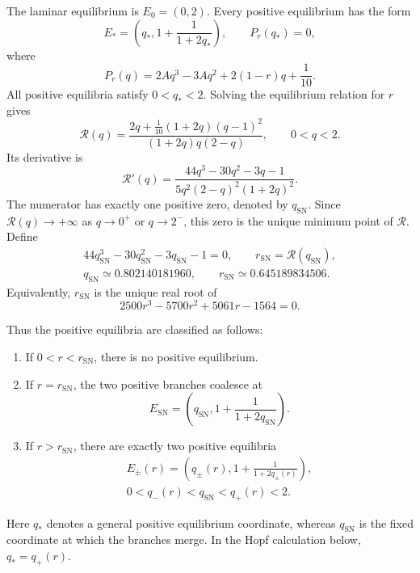 \documentclass[11pt,reqno]{amsart}
\theoremstyle{plain}
\theoremstyle{definition}
\theoremstyle{remark}
\begin{document}
The laminar equilibrium is $E_0=(0,2)$. Every positive equilibrium
has the form
\begin{equation}
E_*
=
\left(
q_*,
1+\frac{1}{1+2q_*}
\right),
\qquad
P_r(q_*)=0,
\label{eq:bl-positive-equilibrium}
\end{equation}
where
\begin{equation}
P_r(q)
=
2Aq^3-3Aq^2+2(1-r)q+\frac{1}{10}.
\label{eq:bl-equilibrium-polynomial}
\end{equation}
All positive equilibria satisfy $0<q_*<2$. Solving the equilibrium
relation for $r$ gives
\begin{equation}
\mathcal R(q)
=
\frac{
2q+\frac{1}{10}(1+2q)(q-1)^2
}{
(1+2q)q(2-q)
},
\qquad
0<q<2.
\label{eq:bl-R-function}
\end{equation}
Its derivative is
\begin{equation}
\mathcal R'(q)
=
\frac{
44q^3-30q^2-3q-1
}{
5q^2(2-q)^2(1+2q)^2
}.
\label{eq:bl-R-derivative}
\end{equation}
The numerator has exactly one positive zero, denoted by
$q_{\mathrm{SN}}$. Since $\mathcal R(q)\to+\infty$ as
$q\to0^+$ or $q\to2^-$, this zero is the unique minimum point of
$\mathcal R$. Define
\begin{equation}
\begin{gathered}
44q_{\mathrm{SN}}^3
-30q_{\mathrm{SN}}^2
-3q_{\mathrm{SN}}-1=0,
\qquad
r_{\mathrm{SN}}
=
\mathcal R(q_{\mathrm{SN}}),
\\
q_{\mathrm{SN}}
\simeq0.802140181960,
\qquad
r_{\mathrm{SN}}
\simeq0.645189834506.
\end{gathered}
\label{eq:bl-fold-values}
\end{equation}
Equivalently, $r_{\mathrm{SN}}$ is the unique real root of
\[
2500r^3-5700r^2+5061r-1564=0.
\]

Thus the positive equilibria are classified as follows:
\begin{enumerate}
\item
If $0<r<r_{\mathrm{SN}}$, there is no positive equilibrium.

\item
If $r=r_{\mathrm{SN}}$, the two positive branches coalesce at
\[
E_{\mathrm{SN}}
=
\left(
q_{\mathrm{SN}},
1+\frac{1}{1+2q_{\mathrm{SN}}}
\right).
\]

\item
If $r>r_{\mathrm{SN}}$, there are exactly two positive equilibria
\begin{equation}
\begin{gathered}
E_\pm(r)
=
\left(
q_\pm(r),
1+\frac{1}{1+2q_\pm(r)}
\right),
\\
0<q_-(r)<q_{\mathrm{SN}}<q_+(r)<2.
\end{gathered}
\label{eq:bl-two-branches}
\end{equation}
\end{enumerate}
Here $q_*$ denotes a general positive equilibrium coordinate,
whereas $q_{\mathrm{SN}}$ is the fixed coordinate at which the
branches merge. In the Hopf calculation below, $q_*=q_+(r)$.
\end{document}
